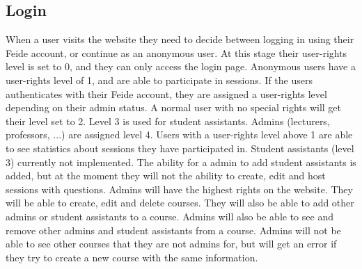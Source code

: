 \subsection{Login}
When a user visits the website they need to decide between logging in using their Feide account, or continue as an anonymous user. At this stage their user-rights level is set to 0, and they can only access the login page. Anonymous users have a user-rights level of 1, and are able to participate in sessions. If the users authenticates with their Feide account, they are assigned a user-rights level depending on their admin status. A normal user with no special rights will get their level set to 2. Level 3 is used for student assistants. Admins (lecturers, professors, ...) are assigned level 4. Users with a user-rights level above 1 are able to see statistics about sessions they have participated in. Student assistants (level 3) currently not implemented. The ability for a admin to add student assistants is added, but at the moment they will not the ability to create, edit and host sessions with questions. Admins will have the highest rights on the website. They will be able to create, edit and delete courses. They will also be able to add other admins or student assistants to a course. Admins will also be able to see and remove other admins and student assistants from a course. Admins will not be able to see other courses that they are not admins for, but will get an error if they try to create a new course with the same information.

